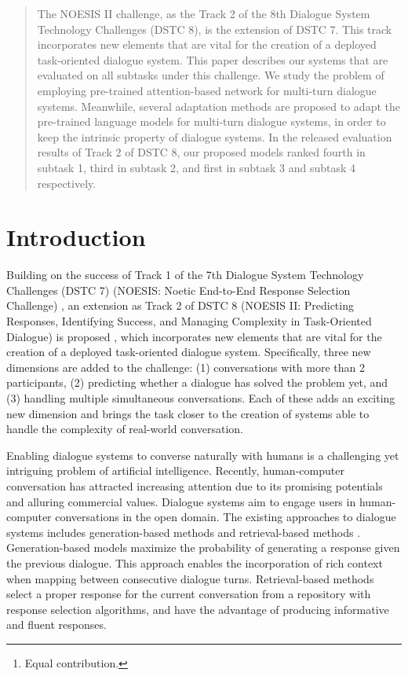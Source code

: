 \documentclass[letterpaper]{article} \usepackage{aaai20}  \usepackage{times}  \usepackage{helvet} \usepackage{courier}  \usepackage[hyphens]{url}  \usepackage{graphicx} \urlstyle{rm} \def\UrlFont{\rm}  \usepackage{graphicx}  \frenchspacing  \setlength{\pdfpagewidth}{8.5in}  \setlength{\pdfpageheight}{11in}
\author{Jia-Chen Gu\thanks{Equal contribution.}, Tianda Li\footnotemark[1], Quan Liu, Xiaodan Zhu, Zhen-Hua Ling, Yu-Ping Ruan \\
  National Engineering Laboratory for Speech and Language Information Processing, \\
      University of Science and Technology of China, Hefei, China \\
  ECE \& Ingenuity Labs, Queen's University, Kingston, Canada \\
{\tt \{gujc,ypruan\}@mail.ustc.edu.cn}, {\tt \{tianda.li,xiaodan.zhu\}@queensu.ca}, \\ {\tt \{quanliu,zhling\}@ustc.edu.cn}
}
\begin{document}
\maketitle

\begin{abstract}
  The NOESIS II challenge, as the Track 2 of the 8th Dialogue System Technology Challenges (DSTC 8), is the extension of DSTC 7.
  This track incorporates new elements that are vital for the creation of a deployed task-oriented dialogue system.
This paper describes our systems that are evaluated on all subtasks under this challenge.
  We study the problem of employing pre-trained attention-based network for multi-turn dialogue systems.
  Meanwhile, several adaptation methods are proposed to adapt the pre-trained language models for multi-turn dialogue systems, in order to keep the intrinsic property of dialogue systems.
  In the released evaluation results of Track 2 of DSTC 8, our proposed models ranked fourth in subtask 1, third in subtask 2, and first in subtask 3 and subtask 4 respectively.
\end{abstract}

\section{Introduction}

  Building on the success of Track 1 of the 7th Dialogue System Technology Challenges (DSTC 7) (NOESIS: Noetic End-to-End Response Selection Challenge) \cite{gunasekara2019dstc7}, an extension as Track 2 of DSTC 8 (NOESIS II: Predicting Responses, Identifying Success, and Managing Complexity in Task-Oriented Dialogue) is proposed \cite{DSTC8}, which incorporates new elements that are vital for the creation of a deployed task-oriented dialogue system.
  Specifically, three new dimensions are added to the challenge:
  (1) conversations with more than 2 participants,
  (2) predicting whether a dialogue has solved the problem yet,
  and (3) handling multiple simultaneous conversations.
  Each of these adds an exciting new dimension and brings the task closer to the creation of systems able to handle the complexity of real-world conversation.

  Enabling dialogue systems to converse naturally with humans is a challenging yet intriguing problem of artificial intelligence.
  Recently, human-computer conversation has attracted increasing attention due to its promising potentials and alluring commercial values.
  Dialogue systems aim to engage users in human-computer conversations in the open domain.
  The existing approaches to dialogue systems includes generation-based methods \cite{DBLP:conf/acl/ShangLL15,DBLP:conf/aaai/SerbanSBCP16} and retrieval-based methods \cite{DBLP:conf/sigdial/LowePSP15,DBLP:journals/dad/LowePSCLP17,DBLP:conf/acl/WuWXZL17,DBLP:conf/coling/ZhangLZZL18}. Generation-based models maximize the probability of generating a response given the previous dialogue.
  This approach enables the incorporation of rich context when mapping between consecutive dialogue turns.
  Retrieval-based methods select a proper response for the current conversation from a repository with response selection algorithms, and have the advantage of producing informative and fluent responses.
\end{document}
